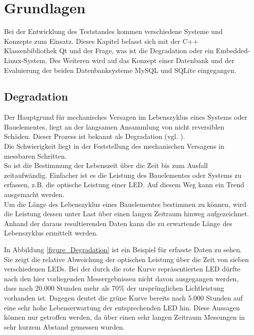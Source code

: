 \chapter{Grundlagen}
\label{chapter_Grundlagen}

Bei der Entwicklung des Teststandes kommen verschiedene Systeme und Konzepte zum Einsatz. Dieses Kapitel befasst sich mit der C++ Klassenbibliothek Qt und der Frage, was ist die Degradation oder ein Embedded-Linux-System. Des Weiteren wird auf das Konzept einer Datenbank und der Evaluierung der beiden Datenbanksysteme MySQL und SQLite eingegangen.

\section{Degradation}
\label{section_Degradation}
Der Hauptgrund für mechanisches Versagen im Lebenszyklus eines Systems oder Bauelementes, liegt an der langsamen Ansammlung von nicht reversiblen Schäden. Dieser Prozess ist bekannt als Degradation (vgl. \cite{zhou2011}).\\
Die Schwierigkeit liegt in der Feststellung des mechanischen Versagens in messbaren Schritten.\\
So ist die Bestimmung der Lebenszeit über die Zeit bis zum Ausfall zeitaufwändig. Einfacher ist es die Leistung des Bauelementes oder Systems zu erfassen, z.B. die optische Leistung einer \ac{LED}. Auf diesem Weg kann ein Trend ausgemacht werden.\\
Um die Länge des Lebenszyklus eines Bauelementes bestimmen zu können, wird die Leistung dessen unter Last über einen langen Zeitraum hinweg aufgezeichnet. Anhand der daraus resultierenden Daten kann die zu erwartende Länge des Lebenszyklus ermittelt werden.\ 

In Abbildung \ref{figure_Degradation} ist ein Beispiel für erfasste Daten zu sehen. Sie zeigt die relative Abweichung der optischen Leistung über die Zeit von sieben verschiedenen \acp{LED}. Bei der durch die rote Kurve repräsentierten LED dürfte nach den hier vorliegenden Messergebnissen nicht davon ausgegangen werden, dass nach 20.000 Stunden mehr als 70\% der ursprünglichen Lichtleistung vorhanden ist. Dagegen deutet die grüne Kurve bereits nach 5.000 Stunden auf eine sehr hohe Lebenserwartung der entsprechenden LED hin. Diese Aussagen können nur getroffen werden, da über einen sehr langen Zeitraum Messungen in sehr kurzem Abstand gemessen wurden.

